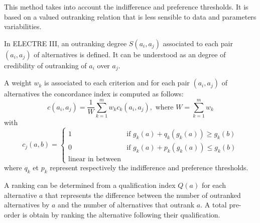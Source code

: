 \begin{enumerate}
This method takes into account the indifference and preference thresholds. It is based on a valued outranking relation that is less sensible to data and parameters variabilities.

In ELECTRE III, an outranking degree $S(a_i, a_j)$ associated to each pair $(a_i, a_j)$ of alternatives is defined. It can be understood as an \og degree of credibility of outranking \fg of $a_i$ over $a_j$.

A weight $w_{k}$ is associated to each criterion and for each pair $(a_i, a_j)$ of alternatives the concordance index is computed as follows:
\begin{equation}
c(a_i, a_j) = \frac{1}{W} \sum_{k=1}^{m} w_{k} c_{k}(a_i, a_j), \text{ where } W = \sum_{k=1}^{m} w_{k}
\end{equation}
with
\begin{equation}
c_{j}(a,b) = \begin{cases}
	1& \text{if $g_{k}(a)+q_{k}(g_{k}(a)) \geq g_{k}(b)$}\\
	0& \text{if $g_{k}(a)+p_{k}(g_{k}(a)) \leq g_{k}(b)$}\\
	\text{linear in between}
	\end{cases}
\end{equation}
where $q_{k}$ et $p_{k}$ represent respectively the indifference and preference thresholds.

A ranking can be determined from a qualification index $Q(a)$ for each alternative $a$ that represents the difference between the number of outranked alternatives by $a$ and the number of alternatives that outrank $a$. A total pre-order is obtain by ranking the alternative following their qualification.

%
\end{enumerate}

